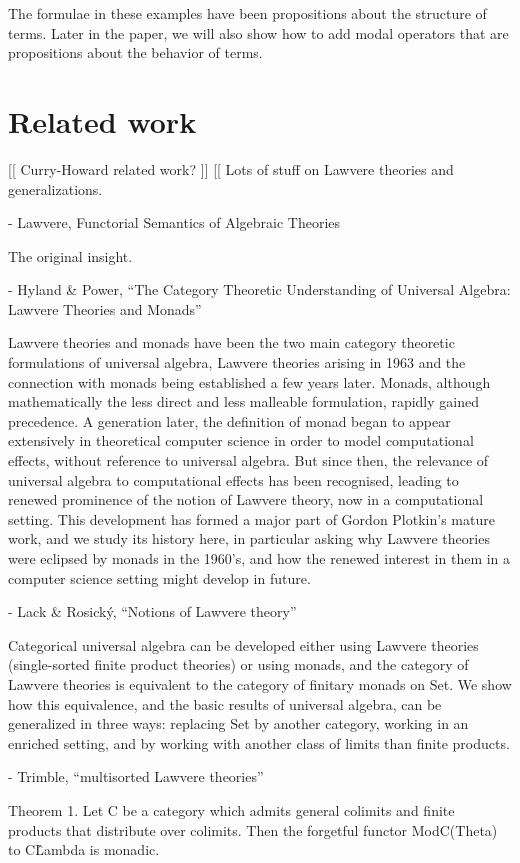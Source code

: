 \documentclass{article}
\begin{document}
The formulae in these examples have been propositions about the structure of terms.  Later in the paper, we will also show how to add modal operators that are propositions about the behavior of terms.

\section{Related work}
[[ Curry-Howard related work? ]]
[[ Lots of stuff on Lawvere theories and generalizations.  

- Lawvere, Functorial Semantics of Algebraic Theories

The original insight.

- Hyland \& Power, ``The Category Theoretic Understanding of Universal Algebra: Lawvere Theories and Monads''

  Lawvere theories and monads have been the two main category theoretic formulations of universal algebra, Lawvere theories arising in 1963 and the connection with monads being established a few years later. Monads, although mathematically the less direct and less malleable formulation, rapidly gained precedence. A generation later, the definition of monad began to appear extensively in theoretical computer science in order to model computational effects, without reference to universal algebra. But since then, the relevance of universal algebra to computational effects has been recognised, leading to renewed prominence of the notion of Lawvere theory, now in a computational setting. This development has formed a major part of Gordon Plotkin’s mature work, and we study its history here, in particular asking why Lawvere theories were eclipsed by monads in the 1960’s, and how the renewed interest in them in a computer science setting might develop in future.

- Lack \& Rosick\'y, ``Notions of Lawvere theory''

  Categorical universal algebra can be developed either using Lawvere theories (single-sorted finite product theories) or using monads, and the category of Lawvere theories is equivalent to the category of finitary monads on Set. We show how this equivalence, and the basic results of universal algebra, can be generalized in three ways: replacing Set by another category, working in an enriched setting, and by working with another class of limits than finite products.
  
- Trimble, ``multisorted Lawvere theories''

  Theorem 1. Let C be a category which admits general colimits and finite products that distribute over colimits. Then the forgetful functor ModC(Theta) to C\^Lambda is monadic.
\end{document}
